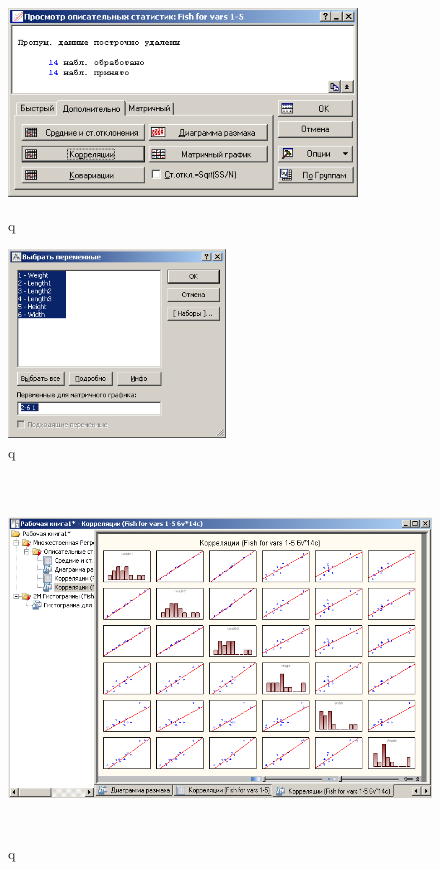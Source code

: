 \begin{figure}[!h]
  \centering
  \begin{minipage}{0.49\textwidth}
    \centering

    \includegraphics[height=5cm]
    {inc/var5__17.PNG}

    \caption{q}
    \label{fig:var5__17}
  \end{minipage}
  \begin{minipage}{0.49\textwidth}
    \centering

    \includegraphics[height=5cm]
    {inc/var5__18.PNG}

    \caption{q}
    \label{fig:var5__18}
  \end{minipage}
\end{figure}

\begin{figure}[!h]
  \centering

  \includegraphics[height=9.6cm]
  {inc/var5__19.PNG}

  \caption{q}

  \label{fig:var5__19}
\end{figure}

